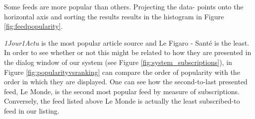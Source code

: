 Some feeds are more popular than others. Projecting the data- points onto the horizontal axis and sorting the results results in the histogram in Figure \ref{fig:feedpopularity}.



{\em 1Jour1Actu} is the most popular article source and Le Figaro - Sant\'e is the least. In order to see whether or not this might be related to how they are presented in the dialog window of our system (see Figure \ref{fig:system_subscriptions}), in Figure \ref{fig:popularityvsranking} can compare the order of popularity with the order in which they are displayed. One can see how the second-to-last presented feed, Le Monde, is the second most popular feed by measure of subscriptions. Conversely, the feed listed above Le Monde is actually the least subscribed-to feed in our listing.


%   



